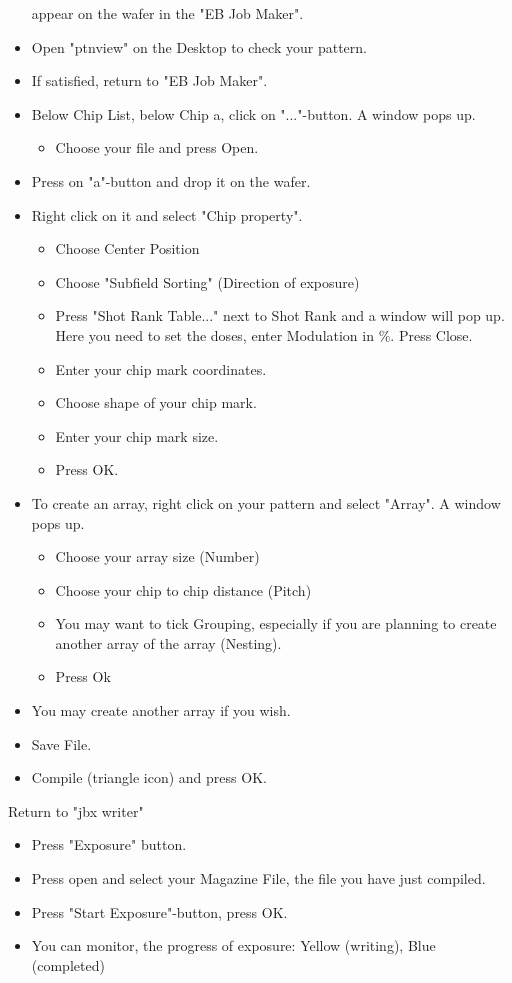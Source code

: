 \begin{itemize}
  appear on the wafer in the "EB Job Maker".
\item  Open  "ptnview"  on  the Desktop  to  check  your
  pattern.
\item If satisfied, return to "EB Job Maker".
\item  Below   Chip  List,   below  Chip  a,   click  on
  "..."-button. A window pops up.
  \begin{itemize}
  \item Choose your file and press Open.
  \end{itemize}
\item Press on "a"-button and drop it on the wafer.
\item Right click on it and select "Chip property".
  \begin{itemize}
  \item Choose Center Position
  \item   Choose   "Subfield  Sorting"   (Direction   of
    exposure)
  \item Press "Shot Rank Table..." next to Shot Rank and
    a  window will  pop up.  Here  you need  to set  the
    doses, enter Modulation in $\%$. Press Close.
  \item Enter your chip mark coordinates.
  \item Choose shape of your chip mark.
  \item Enter your chip mark size.
  \item Press OK.
  \end{itemize}
\item To  create an array,  right click on  your pattern
  and select "Array". A window pops up.
  \begin{itemize}
  \item Choose your array size (Number)
  \item Choose your chip to chip distance (Pitch)
  \item You may want to tick Grouping, especially if you
    are planning  to create  another array of  the array
    (Nesting).
  \item Press Ok
  \end{itemize}
\item You may create another array if you wish.
\item Save File.
\item Compile (triangle icon) and press OK.
\end{itemize}
Return to "jbx writer"
\begin{itemize}
\item Press "Exposure" button.
\item Press open and select your Magazine File, the file
  you have just compiled.
\item Press "Start Exposure"-button, press OK.
\item You can monitor,  the progress of exposure: Yellow
  (writing), Blue (completed)
\end{itemize}

